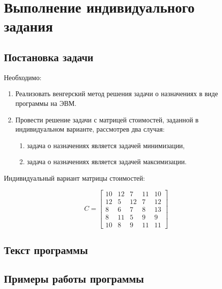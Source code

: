 \chapter{Выполнение индивидуального задания}

\section{Постановка задачи}

Необходимо:
\begin{enumerate}
\item Реализовать венгерский метод решения задачи о назначениях в виде программы на ЭВМ.
\item Провести решение задачи с матрицей стоимостей, заданной в индивидуальном варианте, рассмотрев два случая:
    \begin{enumerate}
    \item задача о назначениях является задачей минимизации,
    \item задача о назначениях является задачей максимизации.
    \end{enumerate}
\end{enumerate}

Индивидуальный вариант матрицы стоимостей:

\begin{equation*}
C = \begin{bmatrix}
10 & 12 & 7 & 11 & 10 \\
12 & 5 & 12 & 7 & 12 \\
8 & 6 & 7 & 8 & 13 \\
8 & 11 & 5 & 9 & 9 \\
10 & 8 & 9 & 11 & 11
\end{bmatrix}
\end{equation*}

\section{Текст программы}


\section{Примеры работы программы}


